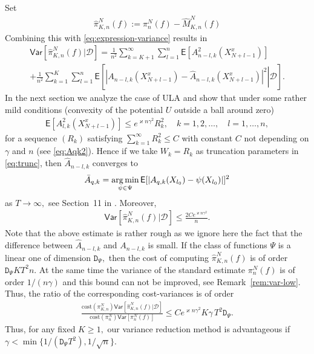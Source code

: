 \documentclass[bj]{imsart}
\def\PE{\mathsf{E}}
\def\PVar{\mathsf{Var}}
\def\TrainSet{\mathcal{D}}
\newcommand*{\argmin}{\operatornamewithlimits{arg\,min}}
\begin{document}
Set
\begin{eqnarray*}
\widehat\pi_{K,n}^N(f):=\pi_n^N(f)-\widehat{M}_{K,n}^N(f)
\end{eqnarray*}
Combining this with \eqref{eq:expression-variance} results in 
\begin{multline*}
\PVar[\widehat \pi_{K,n}^N(f)|\TrainSet]=\frac{1}{n^2}\sum_{k=K+1}^{\infty}\sum_{l=1}^{n}\PE[A^2_{n-l,k}(X^x_{N+l-1})]
\\
+\frac{1}{n^2}\sum_{k=1}^{K}\sum_{l=1}^{n}\PE\left[\left.|A_{n-l,k}(X^x_{N+l-1})-\widehat A_{n-l,k}(X^x_{N+l-1})|^2\right | \TrainSet \right].
\end{multline*}
In the next section we analyze the case of ULA and show that under some rather mild conditions (convexity of the potential $U$ outside a ball around zero)
\begin{eqnarray*}
\PE[A^2_{l,k}(X^x_{N+l-1})]\leq e^{\varkappa n\gamma^2}R^2_k ,\quad k=1,2,\ldots, \quad l=1,\ldots,n,
\end{eqnarray*}
for a sequence  $(R_k)$ satisfying $\sum_{k=1}^\infty R^2_k\leq C$ with constant $C$  not depending  on $\gamma$ and $n$ (see \eqref{eq:Aqk2}).  Hence if we take $W_k=R_k$ as truncation parameters in \eqref{eq:trunc}, then $\widehat A_{n-l,k}$ converges to 
\[
\bar A_{q,k}=\argmin_{\psi\in\Psi}\mathsf{E}[|A_{q,k}(X_{l_0})-\psi(X_{l_0})|]^2
\]
 as $T\to \infty,$ see Section~11 in \cite{gyorfi2006distribution}.  Moreover,
\begin{eqnarray*}
\PVar[\widehat \pi_{K,n}^N(f)|\TrainSet]\leq \frac{2Ce^{\varkappa n\gamma^2}}{n}. 
\end{eqnarray*}
 Note that the above estimate is rather rough as we ignore here the fact that the difference between $\widehat A_{n-l,k}$ and $A_{n-l,k}$ is small.
If the class of functions $\Psi$ is a linear one of dimension $\mathtt{D}_\Psi,$ then the cost of computing $\widehat \pi_{K,n}^N(f)$ is of order $ \mathtt{D}_\Psi K T^2 n$. At the same time the variance of the standard estimate $ \pi_{n}^N(f)$ is of order $1/(n\gamma)$ and this bound can not be improved, see Remark~\ref{rem:var-low}. Thus, the ratio of the corresponding cost-variances is of order
\begin{eqnarray*}
\frac{\mathrm{cost}(\pi_{K,n}^N) \PVar[\widehat \pi_{K,n}^N(f)|\TrainSet]}{\mathrm{cost}(\pi_{n}^N)\PVar[\pi_{n}^N(f)]}\leq C e^{\varkappa n\gamma^2} K \gamma \, T^2 \mathtt{D}_\Psi. 
\end{eqnarray*}
Thus, for any fixed $K\geq 1,$  our variance reduction method is advantageous if $\gamma<\min\{1/(\mathtt{D}_\Psi T^2),1/\sqrt{n}\}.$  
\end{document}
